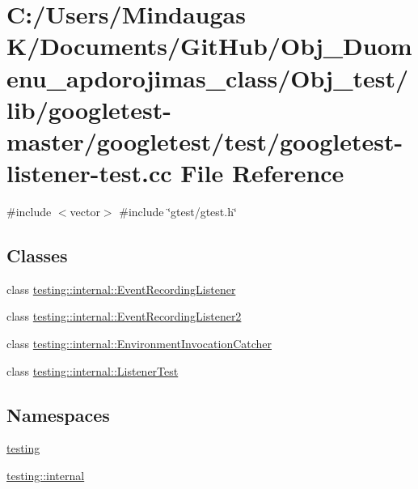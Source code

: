 \hypertarget{_obj__test_2lib_2googletest-master_2googletest_2test_2googletest-listener-test_8cc}{}\section{C\+:/\+Users/\+Mindaugas K/\+Documents/\+Git\+Hub/\+Obj\+\_\+\+Duomenu\+\_\+apdorojimas\+\_\+class/\+Obj\+\_\+test/lib/googletest-\/master/googletest/test/googletest-\/listener-\/test.cc File Reference}
\label{_obj__test_2lib_2googletest-master_2googletest_2test_2googletest-listener-test_8cc}
{\ttfamily \#include $<$vector$>$}\newline
{\ttfamily \#include \char`\"{}gtest/gtest.\+h\char`\"{}}\newline
\subsection*{Classes}
\begin{DoxyCompactItemize}
\item 
class \mbox{\hyperlink{classtesting_1_1internal_1_1_event_recording_listener}{testing\+::internal\+::\+Event\+Recording\+Listener}}
\item 
class \mbox{\hyperlink{classtesting_1_1internal_1_1_event_recording_listener2}{testing\+::internal\+::\+Event\+Recording\+Listener2}}
\item 
class \mbox{\hyperlink{classtesting_1_1internal_1_1_environment_invocation_catcher}{testing\+::internal\+::\+Environment\+Invocation\+Catcher}}
\item 
class \mbox{\hyperlink{classtesting_1_1internal_1_1_listener_test}{testing\+::internal\+::\+Listener\+Test}}
\end{DoxyCompactItemize}
\subsection*{Namespaces}
\begin{DoxyCompactItemize}
\item 
 \mbox{\hyperlink{namespacetesting}{testing}}
\item 
 \mbox{\hyperlink{namespacetesting_1_1internal}{testing\+::internal}}
\end{DoxyCompactItemize}
